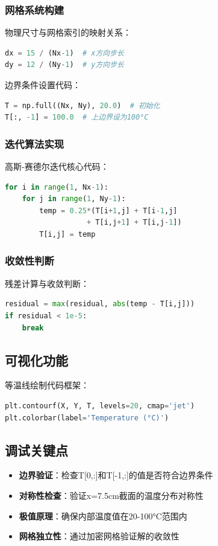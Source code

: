 \documentclass[UTF8]{ctexart}
\begin{document}
\subsubsection{网格系统构建}
物理尺寸与网格索引的映射关系：
\begin{lstlisting}[language=Python]
dx = 15 / (Nx-1)  # x方向步长
dy = 12 / (Ny-1)  # y方向步长
\end{lstlisting}

边界条件设置代码：
\begin{lstlisting}[language=Python]
T = np.full((Nx, Ny), 20.0)  # 初始化
T[:, -1] = 100.0  # 上边界设为100°C
\end{lstlisting}

\subsubsection{迭代算法实现}
高斯-赛德尔迭代核心代码：
\begin{lstlisting}[language=Python]
for i in range(1, Nx-1):
    for j in range(1, Ny-1):
        temp = 0.25*(T[i+1,j] + T[i-1,j] 
                   + T[i,j+1] + T[i,j-1])
        T[i,j] = temp
\end{lstlisting}

\subsubsection{收敛性判断}
残差计算与收敛判断：
\begin{lstlisting}[language=Python]
residual = max(residual, abs(temp - T[i,j]))
if residual < 1e-5:
    break
\end{lstlisting}

\subsection{可视化功能}
等温线绘制代码框架：
\begin{lstlisting}[language=Python]
plt.contourf(X, Y, T, levels=20, cmap='jet')
plt.colorbar(label='Temperature (°C)')
\end{lstlisting}

\subsection{调试关键点}
\begin{itemize}[leftmargin=1.5cm]
    \item \textbf{边界验证}：检查T[0,:]和T[-1,:]的值是否符合边界条件
    \item \textbf{对称性检查}：验证x=7.5cm截面的温度分布对称性
    \item \textbf{极值原理}：确保内部温度值在20-100°C范围内
    \item \textbf{网格独立性}：通过加密网格验证解的收敛性
\end{itemize}
\end{document}
